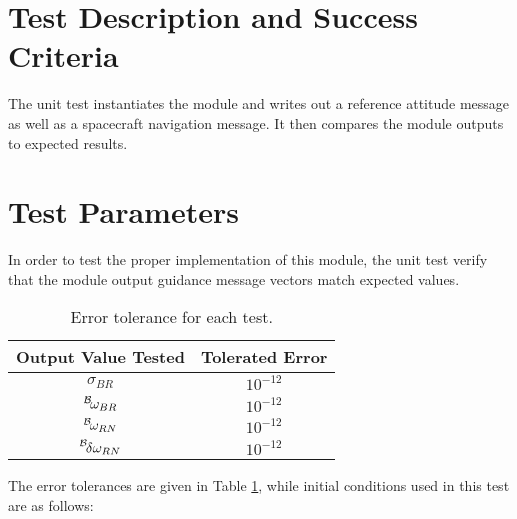 
\section{Test Description and Success Criteria}
The unit test instantiates the module and writes out a reference attitude message as well as a spacecraft navigation message.
It then compares the module outputs to expected results.


\section{Test Parameters}

In order to test the proper implementation of this module, the unit test verify that the module output guidance message vectors match expected values.

\begin{table}[htbp]
	\caption{Error tolerance for each test.}
	\label{tab:errortol}
	\centering \fontsize{10}{10}\selectfont
	\begin{tabular}{ c | c } %
		\hline\hline
		\textbf{Output Value Tested}  &  \textbf{Tolerated Error}  \\ 
		\hline
		$\sigma_{BR}$        & $10^{-12}$	   \\ 
		$\leftexp{B}{\omega_{BR}}$ & $10^{-12}$	   \\ 
		$\leftexp{B}{\omega_{RN}}$ & $10^{-12}$	   \\ 
		$\leftexp{B}{\delta\omega_{RN}}$ & $10^{-12}$	   \\
		\hline\hline
	\end{tabular}
\end{table}

The error tolerances are given in Table \ref{tab:errortol}, while initial conditions used in this test are as follows:

